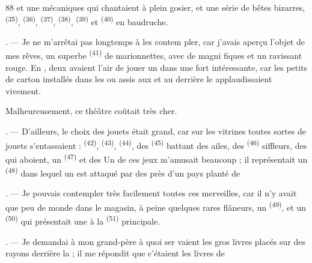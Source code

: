 \begin{VUpage}[90]{88}
\VUcontinue
{} et une  mécaniques qui chantaient à\nl
plein gosier, et une série de bêtes bizarres, \cc
{}\textsuperscript{(35)}, \textsuperscript{(36)}, \textsuperscript{(37)}, \textsuperscript{(38)},\nl
{}\textsuperscript{(39)} et \textsuperscript{(40)} en baudruche.

. --- Je ne m'arrêtai pas longtemps à les contem\cc
pler, car j'avais aperçu l'objet de mes rêves, un\nl
superbe \textsuperscript{(41)} de marionnettes, avec de magni\cc
fiques  et un ravissant  rouge. En\nl
{}, deux  avaient l'air de jouer un \nl
dans une  fort intéressante, car les petits \cc
{} de carton installés dans les  ou assis\nl
aux  et au  derrière le \nl
{} applaudissaient vivement.

\VUblancAlinea
Malheureusement, ce théâtre coûtait très cher.

. --- D'ailleurs, le choix des jouets était grand, car\nl
sur les vitrines toutes sortes de jouets s'entassaient :\nl
{}\textsuperscript{(42)}, \textsuperscript{(43)}, \textsuperscript{(44)}, des\nl
{}\textsuperscript{(45)} battant des ailes, des \textsuperscript{(46)} siffleurs,\nl
des  qui aboient, un \textsuperscript{(47)} et\nl
des  Un de ces jeux m'amusait\nl
beaucoup ; il représentait un \textsuperscript{(48)} dans\nl
lequel un  est attaqué par des  près\nl
d'un pays planté de 

. --- Je pouvais contempler très facilement toutes\nl
ces merveilles, car il n'y avait que peu de monde dans\nl
le magasin, à peine quelques rares flâneurs, un\nl
{}\textsuperscript{(49)}, et un \textsuperscript{(50)} qui présentait une\nl
{} à la \textsuperscript{(51)} principale.

. --- Je demandai à mon grand-père à quoi ser\cc
vaient les gros livres placés sur des rayons derrière\nl
la  ; il me répondit que c'étaient les livres\nl
de 


\end{VUpage}
